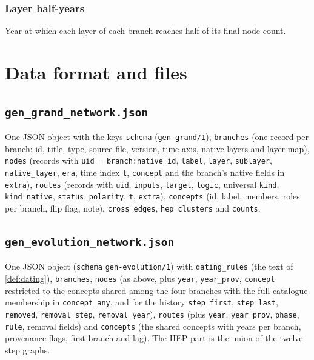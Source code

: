 \documentclass[11pt,a4paper,twoside,openany]{report}
\theoremstyle{plain}
\theoremstyle{definition}
\theoremstyle{remark}
\begin{document}
\subsection*{Layer half-years}
Year at which each layer of each branch reaches half of its final node count.\par\medskip

\normalsize

\chapter{Data format and files}\label{app:data}
\section{\texttt{gen\_grand\_network.json}}
One JSON object with the keys \texttt{schema} (\texttt{gen-grand/1}), \texttt{branches} (one record per branch: id, title, type, source file, version, time axis, native layers and layer map), \texttt{nodes} (records with \texttt{uid} = \texttt{branch:native\_id}, \texttt{label}, \texttt{layer}, \texttt{sublayer}, \texttt{native\_layer}, \texttt{era}, time index \texttt{t}, \texttt{concept} and the branch's native fields in \texttt{extra}), \texttt{routes} (records with \texttt{uid}, \texttt{inputs}, \texttt{target}, \texttt{logic}, universal \texttt{kind}, \texttt{kind\_native}, \texttt{status}, \texttt{polarity}, \texttt{t}, \texttt{extra}), \texttt{concepts} (id, label, members, roles per branch, flip flag, note), \texttt{cross\_edges}, \texttt{hep\_clusters} and \texttt{counts}.
\section{\texttt{gen\_evolution\_network.json}}
One JSON object (\texttt{schema} \texttt{gen-evolution/1}) with \texttt{dating\_rules} (the text of \cref{def:dating}), \texttt{branches}, \texttt{nodes} (as above, plus \texttt{year}, \texttt{year\_prov}, \texttt{concept} restricted to the concepts shared among the four branches with the full catalogue membership in \texttt{concept\_any}, and for the history \texttt{step\_first}, \texttt{step\_last}, \texttt{removed}, \texttt{removal\_step}, \texttt{removal\_year}), \texttt{routes} (plus \texttt{year}, \texttt{year\_prov}, \texttt{phase}, \texttt{rule}, removal fields) and \texttt{concepts} (the \EnSharedFour{} shared concepts with years per branch, provenance flags, first branch and lag). The HEP part is the union of the twelve step graphs.
\end{document}
